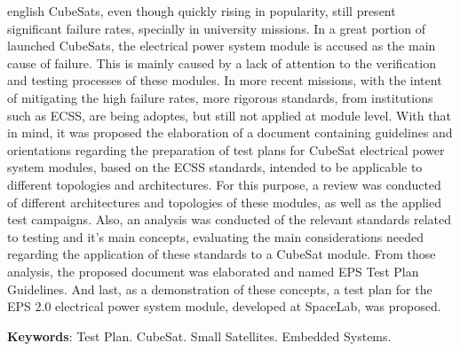\begin{resumo}[Abstract]
	\SingleSpacing
	\begin{otherlanguage*}{english}
		CubeSats, even though quickly rising in popularity, still present significant failure rates, specially in university missions. In a great portion of launched CubeSats, the electrical power system module is accused as the main cause of failure. This is mainly caused by a lack of attention to the verification and testing processes of these modules. In more recent missions, with the intent of mitigating the high failure rates, more rigorous standards, from institutions such as ECSS, are being adoptes, but still not applied at module level. With that in mind, it was proposed the elaboration of a document containing guidelines and orientations regarding the preparation of test plans for CubeSat electrical power system modules, based on the ECSS standards, intended to be applicable to different topologies and architectures. For this purpose, a review was conducted of different architectures and topologies of these modules, as well as the applied test campaigns. Also, an analysis was conducted of the relevant standards related to testing and it's main concepts, evaluating the main considerations needed regarding the application of these standards to a CubeSat module. From those analysis, the proposed document was elaborated and named EPS Test Plan Guidelines. And last, as a demonstration of these concepts, a test plan for the EPS 2.0 electrical power system module, developed at SpaceLab, was proposed.
		
		\textbf{Keywords}: Test Plan. CubeSat. Small Satellites. Embedded Systems.
	\end{otherlanguage*}
\end{resumo}

% 
%
%  

